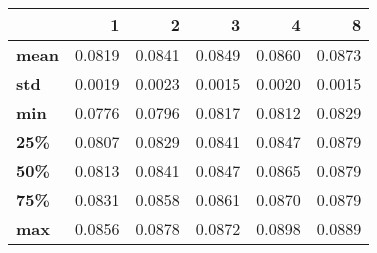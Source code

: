 \begin{tabular}{lrrrrr}
\toprule
{} &       1 &       2 &       3 &       4 &       8 \\
\midrule
\textbf{mean} &  0.0819 &  0.0841 &  0.0849 &  0.0860 &  0.0873 \\
\textbf{std } &  0.0019 &  0.0023 &  0.0015 &  0.0020 &  0.0015 \\
\textbf{min } &  0.0776 &  0.0796 &  0.0817 &  0.0812 &  0.0829 \\
\textbf{25\% } &  0.0807 &  0.0829 &  0.0841 &  0.0847 &  0.0879 \\
\textbf{50\% } &  0.0813 &  0.0841 &  0.0847 &  0.0865 &  0.0879 \\
\textbf{75\% } &  0.0831 &  0.0858 &  0.0861 &  0.0870 &  0.0879 \\
\textbf{max } &  0.0856 &  0.0878 &  0.0872 &  0.0898 &  0.0889 \\
\bottomrule
\end{tabular}
